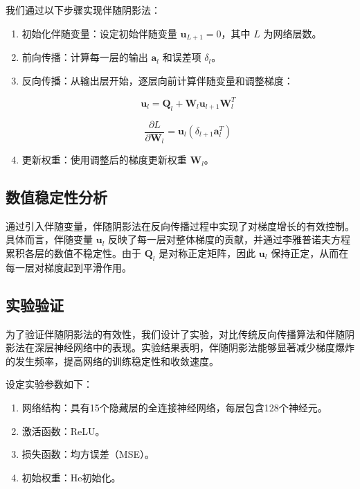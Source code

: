 我们通过以下步骤实现伴随阴影法：

\begin{enumerate}

  \item 初始化伴随变量：设定初始伴随变量 \( \mathbf{u}_{L+1} = 0 \)，其中 \( L \) 为网络层数。

  \item 前向传播：计算每一层的输出 \( \mathbf{a}_l \) 和误差项 \( \delta_l \)。

  \item 反向传播：从输出层开始，逐层向前计算伴随变量和调整梯度：

  \[ \mathbf{u}_l = \mathbf{Q}_l + \mathbf{W}_l \mathbf{u}_{l+1} \mathbf{W}_l^T \]

  \[ \frac{\partial L}{\partial \mathbf{W}_l} = \mathbf{u}_l (\delta_{l+1} \mathbf{a}_l^T) \]

  \item 更新权重：使用调整后的梯度更新权重 \( \mathbf{W}_l \)。

\end{enumerate}

\subsection{数值稳定性分析}

通过引入伴随变量，伴随阴影法在反向传播过程中实现了对梯度增长的有效控制。具体而言，伴随变量 \( \mathbf{u}_l \) 反映了每一层对整体梯度的贡献，并通过李雅普诺夫方程累积各层的数值不稳定性。由于 \( \mathbf{Q}_l \) 是对称正定矩阵，因此 \( \mathbf{u}_l \) 保持正定，从而在每一层对梯度起到平滑作用。

\subsection{实验验证}

为了验证伴随阴影法的有效性，我们设计了实验，对比传统反向传播算法和伴随阴影法在深层神经网络中的表现。实验结果表明，伴随阴影法能够显著减少梯度爆炸的发生频率，提高网络的训练稳定性和收敛速度。

设定实验参数如下：

\begin{enumerate}

  \item 网络结构：具有15个隐藏层的全连接神经网络，每层包含128个神经元。

  \item 激活函数：ReLU。

  \item 损失函数：均方误差（MSE）。

  \item 初始权重：He初始化。

\end{enumerate}

